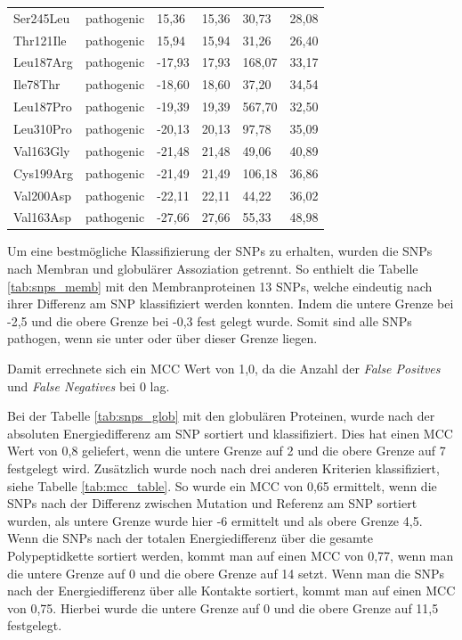 \begin{table}[]
{\begin{tabular}{llllll}
        Ser245Leu & pathogenic & 15,36 & 15,36 & 30,73 & 28,08 \\
        \rowcolor[HTML]{FFCCC9} 
        Thr121Ile & pathogenic & 15,94 & 15,94 & 31,26 & 26,40 \\
        \rowcolor[HTML]{FFCCC9} 
        Leu187Arg & pathogenic & -17,93 & 17,93 & 168,07 & 33,17 \\
        \rowcolor[HTML]{FFCCC9} 
        Ile78Thr & pathogenic & -18,60 & 18,60 & 37,20 & 34,54 \\
        \rowcolor[HTML]{FFCCC9} 
        Leu187Pro & pathogenic & -19,39 & 19,39 & 567,70 & 32,50 \\
        \rowcolor[HTML]{FFCCC9} 
        Leu310Pro & pathogenic & -20,13 & 20,13 & 97,78 & 35,09 \\
        \rowcolor[HTML]{FFCCC9} 
        Val163Gly & pathogenic & -21,48 & 21,48 & 49,06 & 40,89 \\
        \rowcolor[HTML]{FFCCC9} 
        Cys199Arg & pathogenic & -21,49 & 21,49 & 106,18 & 36,86 \\
        \rowcolor[HTML]{FFCCC9} 
        Val200Asp & pathogenic & -22,11 & 22,11 & 44,22 & 36,02 \\
        \rowcolor[HTML]{FFCCC9} 
        Val163Asp & pathogenic & -27,66 & 27,66 & 55,33 & 48,98
    \end{tabular}}
\end{table}

Um eine bestmögliche Klassifizierung der \ac{SNP}s zu erhalten, wurden die \ac{SNP}s nach Membran und globulärer Assoziation getrennt. So enthielt die Tabelle \ref{tab:snps_memb} mit den Membranproteinen 13 \ac{SNP}s, welche eindeutig nach ihrer Differenz am \ac{SNP} klassifiziert werden konnten. Indem die untere Grenze bei -2,5 und die obere Grenze bei -0,3 fest gelegt wurde. Somit sind alle \ac{SNP}s pathogen, wenn sie unter oder über dieser Grenze liegen.

Damit errechnete sich ein MCC Wert von 1,0, da die Anzahl der \emph{False Positves} und \emph{False Negatives} bei 0 lag.

Bei der Tabelle \ref{tab:snps_glob} mit den globulären Proteinen, wurde nach der absoluten Energiedifferenz am \ac{SNP} sortiert und klassifiziert. Dies hat einen MCC Wert von 0,8 geliefert, wenn die untere Grenze auf 2 und die obere Grenze auf 7 festgelegt wird. Zusätzlich wurde noch nach drei anderen Kriterien klassifiziert, siehe Tabelle \ref{tab:mcc_table}. So wurde ein MCC von 0,65 ermittelt, wenn die \ac{SNP}s nach der Differenz zwischen Mutation und Referenz am \ac{SNP} sortiert wurden, als untere Grenze wurde hier -6 ermittelt und als obere Grenze 4,5. Wenn die \ac{SNP}s nach der totalen Energiedifferenz über die gesamte Polypeptidkette sortiert werden, kommt man auf einen MCC von 0,77, wenn man die untere Grenze auf 0 und die obere Grenze auf 14 setzt. Wenn man die \ac{SNP}s nach der Energiedifferenz über alle Kontakte sortiert, kommt man auf einen MCC von 0,75. Hierbei wurde die untere Grenze auf 0 und die obere Grenze auf 11,5 festgelegt.

